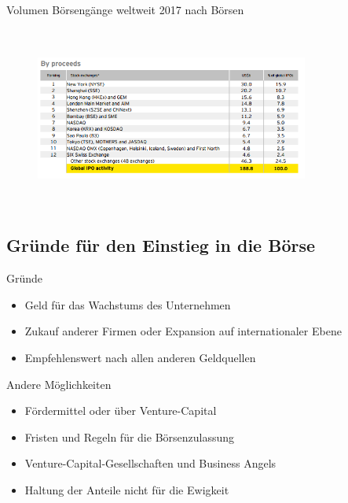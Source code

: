 \documentclass{beamer}
\begin{document}
\begin{frame} {Volumen Börsengänge weltweit 2017 nach Börsen}
\begin{figure}
	\centering
	\includegraphics[width=9cm, height=6cm]{IPOsExchangeProceeds.PNG}
\end{figure}
\end{frame}







\subsection{Gründe für den Einstieg in die Börse}
\begin{frame} {Gründe}
\begin{itemize}
\item Geld für das Wachstums des Unternehmen  \pause
\item Zukauf anderer Firmen oder Expansion auf internationaler Ebene   \pause
\item Empfehlenswert nach allen anderen Geldquellen   \pause
\end{itemize}
\end{frame}
\begin{frame} {Andere Möglichkeiten}
\begin{itemize}
\item Fördermittel oder über Venture-Capital 
\item Fristen und Regeln für die Börsenzulassung
\item Venture-Capital-Gesellschaften und Business Angels
\item Haltung der Anteile nicht für die Ewigkeit
\end{itemize}
\end{frame}
\end{document}

